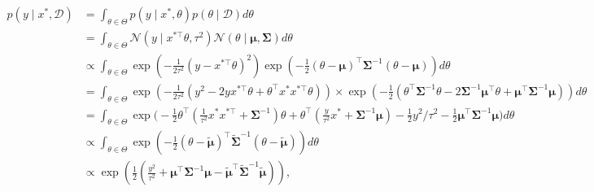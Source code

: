 \[
    \begin{aligned}
        p(y \mid x^{*}, \mathcal{D}) & = \int_{\theta \in \Theta} p(y \mid x^{*}, \theta) p(\theta \mid \mathcal{D}) d\theta                                                                                                                                                         \\
                                     & = \int_{\theta \in \Theta} \mathcal{N}(y \mid x^{*\top}\theta, \tau^{2}) \mathcal{N}(\theta \mid \boldsymbol{\mu}, \boldsymbol{\Sigma}) d\theta                                                                                               \\
                                     & \propto \int_{\theta \in \Theta} \exp\left( -\frac{1}{2\tau^{2}} (y - x^{*\top}\theta)^{2} \right) \exp\left( -\frac{1}{2} (\theta - \boldsymbol{\mu})^{\top} \boldsymbol{\Sigma}^{-1} (\theta - \boldsymbol{\mu}) \right) d\theta            \\
                                     & = \int_{\theta \in \Theta} \exp\left( -\frac{1}{2\tau^{2}} (y^{2} - 2 y x^{*\top}\theta + \theta^{\top} x^{*} x^{*\top} \theta) \right)                                                                                                        \times \exp\left( -\frac{1}{2} (\theta^{\top} \boldsymbol{\Sigma}^{-1} \theta - 2 \boldsymbol{\Sigma}^{-1} \boldsymbol{\mu}^{\top} \theta + \boldsymbol{\mu}^{\top} \boldsymbol{\Sigma}^{-1} \boldsymbol{\mu}) \right) d\theta          \\
                                     & = \int_{\theta \in \Theta} \exp\Bigg( -\frac{1}{2} \theta^{\top} \left( \frac{1}{\tau^{2}} x^{*} x^{*\top} + \boldsymbol{\Sigma}^{-1} \right) \theta                                                                                          + \theta^{\top} \left( \frac{y}{\tau^{2}} x^{*} + \boldsymbol{\Sigma}^{-1} \boldsymbol{\mu} \right) - \frac{1}{2} y^{2} / \tau^{2} - \frac{1}{2} \boldsymbol{\mu}^{\top} \boldsymbol{\Sigma}^{-1} \boldsymbol{\mu} \Bigg) d\theta       \\
                                     & \propto \int_{\theta \in \Theta} \exp\left( -\frac{1}{2} (\theta - \boldsymbol{\tilde{\mu}})^{\top} \boldsymbol{\tilde{\Sigma}}^{-1} (\theta - \boldsymbol{\tilde{\mu}}) \right) d\theta                                                      \\
                                     & \propto \exp\left( \frac{1}{2} \left( \frac{y^{2}}{\tau^{2}} + \boldsymbol{\mu}^{\top} \boldsymbol{\Sigma}^{-1} \boldsymbol{\mu} - \boldsymbol{\tilde{\mu}}^{\top} \boldsymbol{\tilde{\Sigma}}^{-1} \boldsymbol{\tilde{\mu}} \right) \right),
    \end{aligned}
\]

